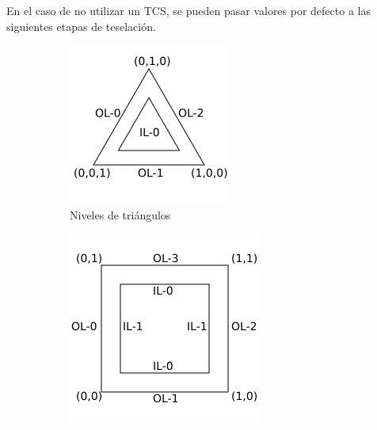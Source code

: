 En el caso de no utilizar un TCS, se pueden pasar valores por defecto a las
siguientes etapas de teselación.

\begin{figure}[t]
	\centering
	\begin{subfigure}{.45\textwidth}
		\includegraphics[width=\textwidth]{figures/TriangleLevels.png}	
		\caption{Niveles de triángulos}
	\end{subfigure}
	\hfill
	\begin{subfigure}{.45\textwidth}
		\includegraphics[width=\textwidth]{figures/QuadLevels.png}	

\end{subfigure}
\end{figure}
